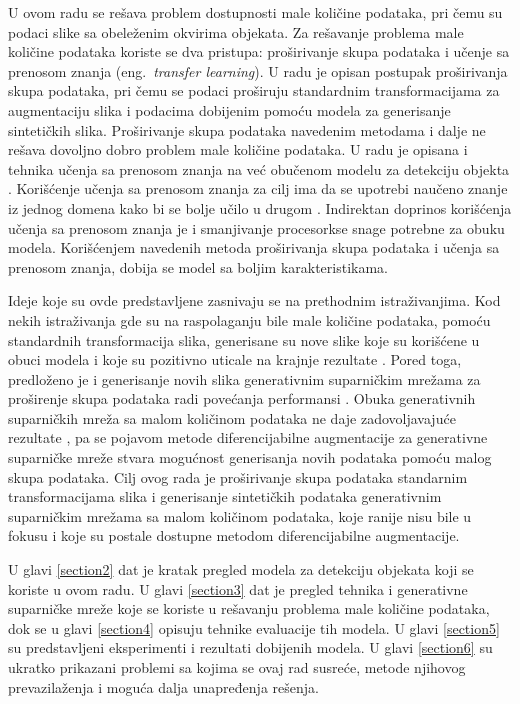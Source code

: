 \documentclass[12pt,oneside]{memoir}
\begin{document}
U ovom radu se rešava problem dostupnosti male količine podataka, pri čemu su podaci slike sa obeleženim okvirima objekata. Za rešavanje problema male količine podataka koriste se dva pristupa: proširivanje skupa podataka i učenje sa prenosom znanja (eng.~\textit{transfer learning}).
U radu je opisan postupak proširivanja skupa podataka, pri čemu se podaci proširuju standardnim transformacijama za augmentaciju slika i podacima dobijenim pomoću modela za generisanje sintetičkih slika.
Proširivanje skupa podataka navedenim metodama i dalje ne rešava dovoljno dobro problem male količine podataka.
U radu je opisana i tehnika učenja sa prenosom znanja \cite{zhuang2020comprehensive} na već obučenom modelu za detekciju objekta \cite{bochkovskiy2020yolov4}. Korišćenje učenja sa prenosom znanja za cilj ima da se upotrebi naučeno znanje iz jednog domena kako bi se bolje učilo u drugom \cite{bengio2012deep}. Indirektan doprinos korišćenja učenja sa prenosom znanja je i smanjivanje procesorkse snage potrebne za obuku modela.
Korišćenjem navedenih metoda proširivanja skupa podataka i učenja sa prenosom znanja, dobija se model sa boljim karakteristikama.

Ideje koje su ovde predstavljene zasnivaju se na prethodnim istraživanjima. Kod nekih istraživanja gde su na raspolaganju bile male količine podataka, pomoću standardnih transformacija slika, generisane su nove slike koje su korišćene u obuci modela i koje su pozitivno uticale na krajnje rezultate  \cite{brigato2021close}. Pored toga, predloženo je i generisanje novih slika generativnim suparničkim mrežama za proširenje skupa podataka radi povećanja performansi \cite{brigato2021close,liu2019generative}. Obuka generativnih suparničkih mreža sa malom količinom podataka ne daje zadovoljavajuće rezultate \cite{brigato2021close}, pa se pojavom metode diferencijabilne augmentacije za generativne suparničke mreže \cite{zhao2020differentiable} stvara mogućnost generisanja novih podataka pomoću malog skupa podataka. 
Cilj ovog rada je proširivanje skupa podataka standarnim transformacijama slika i generisanje sintetičkih podataka generativnim suparničkim mrežama sa malom količinom podataka, koje ranije nisu bile u fokusu i koje su postale dostupne metodom diferencijabilne augmentacije.

U glavi \ref{section2} dat je kratak pregled modela za detekciju objekata koji se koriste u ovom radu. U glavi \ref{section3} dat je pregled tehnika i generativne suparničke mreže koje se koriste u rešavanju problema male količine podataka, dok se u glavi \ref{section4} opisuju tehnike evaluacije tih modela. U glavi \ref{section5} su predstavljeni eksperimenti i rezultati dobijenih modela. U glavi \ref{section6} su ukratko prikazani problemi sa kojima se ovaj rad susreće, metode njihovog prevazilaženja i moguća dalja unapređenja rešenja.
\end{document}
